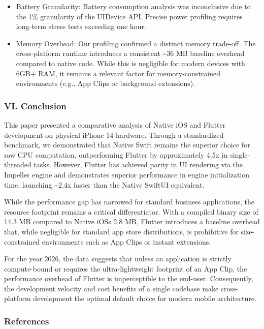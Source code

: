 \documentclass[
]{article}
\begin{document}
\begin{itemize}
\item
  Battery Granularity: Battery consumption analysis was inconclusive due
  to the 1\% granularity of the UIDevice API. Precise power profiling
  requires long-term stress tests exceeding one hour.
\item
  Memory Overhead: Our profiling confirmed a distinct memory trade-off.
  The cross-platform runtime introduces a consistent \textasciitilde36
  MB baseline overhead compared to native code. While this is negligible
  for modern devices with 6GB+ RAM, it remains a relevant factor for
  memory-constrained environments (e.g., App Clips or background
  extensions).
\end{itemize}

\subsubsection{\texorpdfstring{\textbf{VI.
Conclusion}}{VI. Conclusion}}\label{vi.-conclusion}

This paper presented a comparative analysis of Native iOS and Flutter
development on physical iPhone 14 hardware. Through a standardized
benchmark, we demonstrated that Native Swift remains the superior choice
for raw CPU computation, outperforming Flutter by approximately 4.5x in
single-threaded tasks. However, Flutter has achieved parity in UI
rendering via the Impeller engine and demonstrates superior performance
in engine initialization time, launching \textasciitilde2.4x faster than
the Native SwiftUI equivalent.

While the performance gap has narrowed for standard business
applications, the resource footprint remains a critical differentiator.
With a compiled binary size of 14.3 MB compared to Native
iOS\textquotesingle s 2.8 MB, Flutter introduces a baseline overhead
that, while negligible for standard app store distributions, is
prohibitive for size-constrained environments such as App Clips or
instant extensions.

For the year 2026, the data suggests that unless an application is
strictly compute-bound or requires the ultra-lightweight footprint of an
App Clip, the performance overhead of Flutter is imperceptible to the
end-user. Consequently, the development velocity and cost benefits of a
single codebase make cross-platform development the optimal default
choice for modern mobile architecture.

\subsubsection{\texorpdfstring{\textbf{References}}{References}}\label{references}
\end{document}
